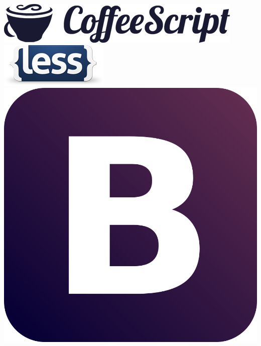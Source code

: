 \begin{frame}
\begin{center}
\end{center}		
	
	
	\includegraphics[scale=0.4]{client/coffeescript-logo.png}
	\includegraphics[scale=0.40]{client/less-logo.png}
	\includegraphics[scale=0.045]{client/bootstrap-logo.png}
\end{frame}

